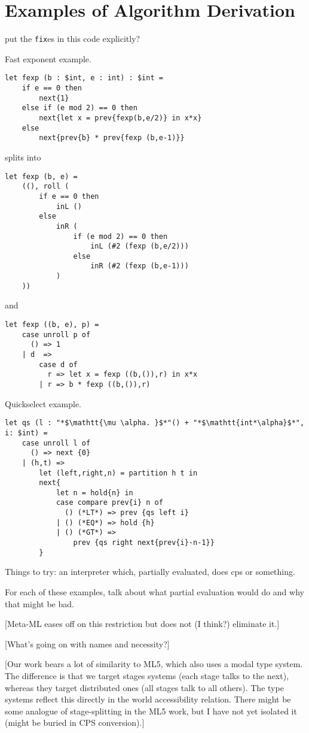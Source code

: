 

\section{Examples of Algorithm Derivation}
\label{sec:examples}

\TODO put the \verb|fix|es in this code explicitly?

Fast exponent example.  

\begin{lstlisting} 
let fexp (b : $int, e : int) : $int =
	if e == 0 then
		next{1}
	else if (e mod 2) == 0 then
		next{let x = prev{fexp(b,e/2)} in x*x}
	else
		next{prev{b} * prev{fexp (b,e-1)}}		
\end{lstlisting}

splits into

\begin{lstlisting} 
let fexp (b, e) =
	((), roll (
		if e == 0 then
			inL ()
		else 
			inR (
				if (e mod 2) == 0 then
					inL (#2 (fexp (b,e/2)))
				else
					inR (#2 (fexp (b,e-1)))
			)
	))
\end{lstlisting}

and

\begin{lstlisting} 
let fexp ((b, e), p) =
	case unroll p of
	  () => 1
	| d  =>
		case d of
		  r => let x = fexp ((b,()),r) in x*x
		| r => b * fexp ((b,()),r)
\end{lstlisting}

Quickselect example.

\begin{lstlisting} 
let qs (l : "*$\mathtt{\mu \alpha. }$*"() + "*$\mathtt{int*\alpha}$*", i: $int) = 
	case unroll l of
	  () => next {0}
	| (h,t) => 
		let (left,right,n) = partition h t in
		next{
			let n = hold{n} in
			case compare prev{i} n of
			  () (*LT*) => prev {qs left i}
			| () (*EQ*) => hold {h}
			| () (*GT*) => 
				prev {qs right next{prev{i}-n-1}}
		}	
\end{lstlisting}

Things to try: an interpreter which, partially evaluated, does cps or something.

For each of these examples, talk about what partial evaluation would do and why that might be bad.


[Meta-ML eases off on this restriction but does not (I think?) eliminate it.]

[What's going on with names and necessity?]

[Our work bears a lot of similarity to ML5, which also uses a modal type system.  The difference is that we target stages systems (each stage talks to the next), whereas they target distributed ones (all stages talk to all others). The type systems reflect this directly in the world accessibility relation.  There might be some analogue of stage-splitting in the ML5 work, but I have not yet isolated it (might be buried in CPS conversion).]

